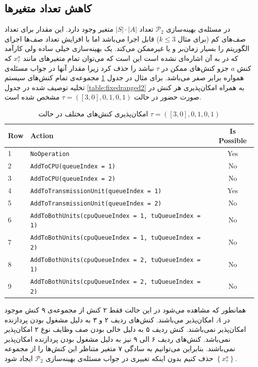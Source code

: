 \subsection{کاهش تعداد متغیرها}
\label{sub:reducevariable}
در مسئله‌ی بهینه‌سازی 
$\mathcal{P}_2$
تعداد 
$|S| \cdot |A|$
متغیر وجود دارد. این مقدار برای تعداد صف‌های کم (برای مثال $k \leq 3$) قابل اجرا می‌باشد اما با افزایش تعداد صف‌ها اجرای الگوریتم را بسیار زمان‌بر و یا غیرممکن می‌کند. یک بهینه‌سازی خیلی ساده ولی کارآمد که در \cite{Liu} به آن اشاره‌ای نشده است این است که می‌توان تمام متغیرهای مانند
$x_{\tau}^{a}$
که کنش
$a$
جزو کنش‌های ممکن در
$\tau$
نباشد را حذف کرد زیرا مقدار آنها در جواب مسئله‌ی همواره برابر صفر می‌باشد. برای مثال در جدول \ref{table:isactionpossible} مجموعه‌ی تمام کنش‌های سیستم تخلیه توصیف شده در جدول \ref{table:fixedranged2} به همراه امکان‌پذیری هر کنش در صورت حضور در حالت 
$\tau = ([3, 0], 0, 1, 0, 1)$
مشخص شده است.
\begin{table}
	\centering
	\begin{latin}
\begin{tabular}{llc}
	\hline Row & Action & Is Possible \\
	\hline 
1            & \texttt{\footnotesize NoOperation}                                         & Yes \\
2            & \texttt{\footnotesize AddToCPU(queueIndex = 1)}                            & No \\
3            & \texttt{\footnotesize AddToCPU(queueIndex = 2)}                            & No \\
4            & \texttt{\footnotesize AddToTransmissionUnit(queueIndex = 1)}               & Yes \\
5            & \texttt{\footnotesize AddToTransmissionUnit(queueIndex = 2)}               & No \\
6            & \texttt{\footnotesize AddToBothUnits(cpuQueueIndex = 1, tuQueueIndex = 1)} & No  \\
7            & \texttt{\footnotesize AddToBothUnits(cpuQueueIndex = 1, tuQueueIndex = 2)} & No \\
8            & \texttt{\footnotesize AddToBothUnits(cpuQueueIndex = 2, tuQueueIndex = 1)} &No \\
9            & \texttt{\footnotesize AddToBothUnits(cpuQueueIndex = 2, tuQueueIndex = 2)} &No \\\bottomrule
	\hline
\end{tabular}
	\end{latin}
	\caption[امکان‌پذیری کنش‌های مختلف]{امکان‌پذیری کنش‌های مختلف در حالت $\tau = ([3, 0], 0, 1, 0, 1)$}
	\label{table:isactionpossible}
\end{table}
همانطور که مشاهده می‌شود در این حالت فقط ۲ کنش از مجموعه‌ی ۹ کنش موجود در $A$ امکان‌پذیر می‌باشند. کنش‌های ردیف ۲ و ۳ به دلیل مشغول بودن پردازنده امکان‌پذیر نمی‌باشند. کنش ردیف ۵ به دلیل خالی بودن صف وظایف نوع ۲ امکان‌پذیر نمی‌باشد. کنش‌های ردیف ۶ الی ۹ نیز به دلیل مشغول بودن پردازنده امکان‌پذیر نمی‌باشند. بنابراین می‌توانیم به سادگی ۷ متغیر متناظر این کنش‌ها را از مجموعه $\left\{x_{\tau}^{a}\right\}$ حذف کنیم بدون اینکه تغییری در جواب مسئله‌ی بهینه‌سازی $\mathcal{P}_2$ ایجاد شود.
